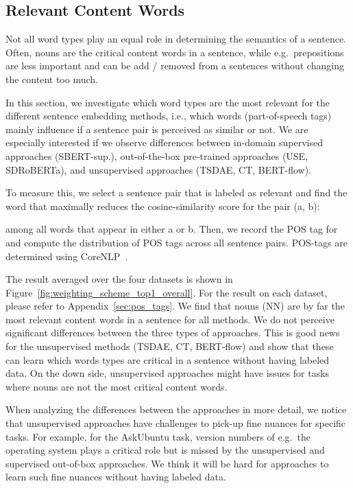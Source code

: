 \documentclass[11pt,a4paper]{article}
\begin{document}
\subsection{Relevant Content Words}

Not all word types play an equal role in determining the semantics of a sentence. Often, nouns are the critical content words in a sentence, while e.g.\ prepositions are less important and can be add / removed from a sentences without changing the content too much.

In this section, we investigate which word types are the most relevant for the different sentence embedding methods, i.e., which words (part-of-speech tags) mainly influence if a sentence pair is perceived as similar or not. We are especially interested if we observe differences between in-domain supervised approaches (SBERT-sup.), out-of-the-box pre-trained approaches (USE, SDRoBERTa), and unsupervised approaches (TSDAE, CT, BERT-flow).  

To measure this, we select a sentence pair  that is labeled as relevant and find the word that maximally reduces the cosine-similarity score for the pair (a, b):

among all words  that appear in either a or b. Then, we record the POS tag for  and compute the distribution of POS tags across all sentence pairs. POS-tags are determined using CoreNLP~\citep{manning-etal-2014-stanford}.

The result averaged over the four datasets is shown in Figure~\ref{fig:weighting_scheme_top1_overall}. For the result on each dataset, please refer to Appendix~\ref{sec:pos_tags}. We find that nouns (NN) are by far the most relevant content words in a sentence for all methods. We do not perceive significant differences between the three types of approaches. This is good news for the unsupervised methods (TSDAE, CT, BERT-flow) and show that these can learn which words types are critical in a sentence without having labeled data. On the down side, unsupervised approaches might have issues for tasks where nouns are not the most critical content words.

When analyzing the differences between the approaches in more detail, we notice that unsupervised approaches have challenges to pick-up fine nuances for specific tasks. For example, for the AskUbuntu task, version numbers of e.g.\ the operating system plays a critical role but is missed by the unsupervised and supervised out-of-box approaches. We think it will be hard for approaches to learn such fine nuances without having labeled data.
\end{document}
